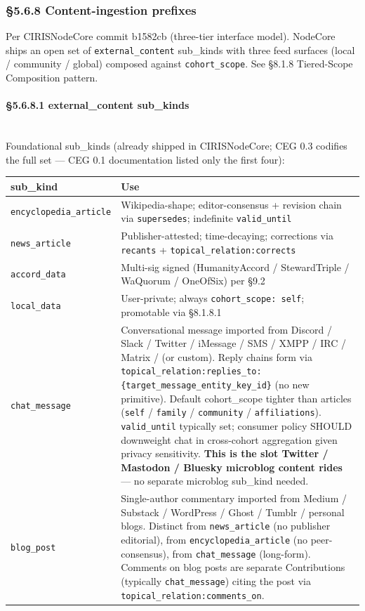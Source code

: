 \documentclass[10pt]{article}
\begin{document}
\subsubsection*{§5.6.8 Content-ingestion prefixes}


Per CIRISNodeCore commit b1582cb (three-tier interface model). NodeCore ships an open set of \texttt{external\_content} sub\_kinds with three feed surfaces (local / community / global) composed against \texttt{cohort\_scope}. See §8.1.8 Tiered-Scope Composition pattern.


\paragraph{§5.6.8.1 external\_content sub\_kinds}\mbox{}\\


Foundational sub\_kinds (already shipped in CIRISNodeCore; CEG 0.3 codifies the full set — CEG 0.1 documentation listed only the first four):


{\footnotesize
\begin{longtable}{|p{8.0cm}|p{8.0cm}|}\hline
\textbf{sub\_kind} & \textbf{Use} \\ \hline\endhead
\texttt{encyclopedia\_article} & Wikipedia-shape; editor-consensus + revision chain via \texttt{supersedes}; indefinite \texttt{valid\_until} \\ \hline
\texttt{news\_article} & Publisher-attested; time-decaying; corrections via \texttt{recants} + \texttt{topical\_relation:corrects} \\ \hline
\texttt{accord\_data} & Multi-sig signed (HumanityAccord / StewardTriple / WaQuorum / OneOfSix) per §9.2 \\ \hline
\texttt{local\_data} & User-private; always \texttt{cohort\_scope: self}; promotable via §8.1.8.1 \\ \hline
\texttt{chat\_message} & Conversational message imported from Discord / Slack / Twitter / iMessage / SMS / XMPP / IRC / Matrix / (or custom). Reply chains form via \texttt{topical\_relation:replies\_to:\{target\_message\_entity\_key\_id\}} (no new primitive). Default cohort\_scope tighter than articles (\texttt{self} / \texttt{family} / \texttt{community} / \texttt{affiliations}). \texttt{valid\_until} typically set; consumer policy SHOULD downweight chat in cross-cohort aggregation given privacy sensitivity. \textbf{This is the slot Twitter / Mastodon / Bluesky microblog content rides} — no separate microblog sub\_kind needed. \\ \hline
\texttt{blog\_post} & Single-author commentary imported from Medium / Substack / WordPress / Ghost / Tumblr / personal blogs. Distinct from \texttt{news\_article} (no publisher editorial), from \texttt{encyclopedia\_article} (no peer-consensus), from \texttt{chat\_message} (long-form). Comments on blog posts are separate Contributions (typically \texttt{chat\_message}) citing the post via \texttt{topical\_relation:comments\_on}. \\ \hline
\end{longtable}}
\end{document}
